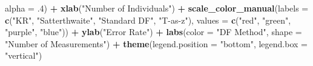 \documentclass[12pt, twoside]{amherstthesis}
\newenvironment{Shaded}{\begin{snugshade}}{\end{snugshade}}
\newcommand{\DataTypeTok}[1]{\textcolor[rgb]{0.13,0.29,0.53}{#1}}
\newcommand{\FloatTok}[1]{\textcolor[rgb]{0.00,0.00,0.81}{#1}}
\newcommand{\KeywordTok}[1]{\textcolor[rgb]{0.13,0.29,0.53}{\textbf{#1}}}
\newcommand{\NormalTok}[1]{#1}
\newcommand{\OperatorTok}[1]{\textcolor[rgb]{0.81,0.36,0.00}{\textbf{#1}}}
\newcommand{\StringTok}[1]{\textcolor[rgb]{0.31,0.60,0.02}{#1}}
\begin{document}
\begin{Shaded}
\begin{Highlighting}[]
{{{{{{{{{{{           \DataTypeTok{alpha =} \FloatTok{.4}\NormalTok{) }\OperatorTok{+}
\StringTok{  }\KeywordTok{xlab}\NormalTok{(}\StringTok{"Number of Individuals"}\NormalTok{) }\OperatorTok{+}
\StringTok{  }\KeywordTok{scale_color_manual}\NormalTok{(}\DataTypeTok{labels =} \KeywordTok{c}\NormalTok{(}\StringTok{"KR"}\NormalTok{, }\StringTok{"Satterthwaite"}\NormalTok{, }\StringTok{"Standard DF"}\NormalTok{, }\StringTok{"T-as-z"}\NormalTok{), }
                     \DataTypeTok{values =} \KeywordTok{c}\NormalTok{(}\StringTok{"red"}\NormalTok{, }\StringTok{"green"}\NormalTok{, }\StringTok{"purple"}\NormalTok{, }\StringTok{"blue"}\NormalTok{)) }\OperatorTok{+}
\StringTok{  }\KeywordTok{ylab}\NormalTok{(}\StringTok{"Error Rate"}\NormalTok{) }\OperatorTok{+}
\StringTok{  }\KeywordTok{labs}\NormalTok{(}\DataTypeTok{color =} \StringTok{"DF Method"}\NormalTok{, }\DataTypeTok{shape =} \StringTok{"Number of Measurements"}\NormalTok{) }\OperatorTok{+}
\StringTok{  }\KeywordTok{theme}\NormalTok{(}\DataTypeTok{legend.position =} \StringTok{"bottom"}\NormalTok{, }\DataTypeTok{legend.box =} \StringTok{"vertical"}\NormalTok{)}


}}}}}}}}}}}
\end{Highlighting}
\end{Shaded}
\end{document}

